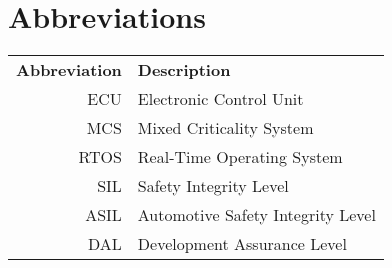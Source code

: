 \chapter*{Abbreviations}
\noindent{}\begin{tabular}{r  l}
\textbf{Abbreviation} 	& \textbf{Description} \vspace{.5em} \\
ECU		&Electronic Control Unit\\
MCS		&Mixed Criticality System\\
RTOS	&Real-Time Operating System\\
SIL		&Safety Integrity Level\\
ASIL	&Automotive Safety Integrity Level\\
DAL		&Development Assurance Level\\
\end{tabular}